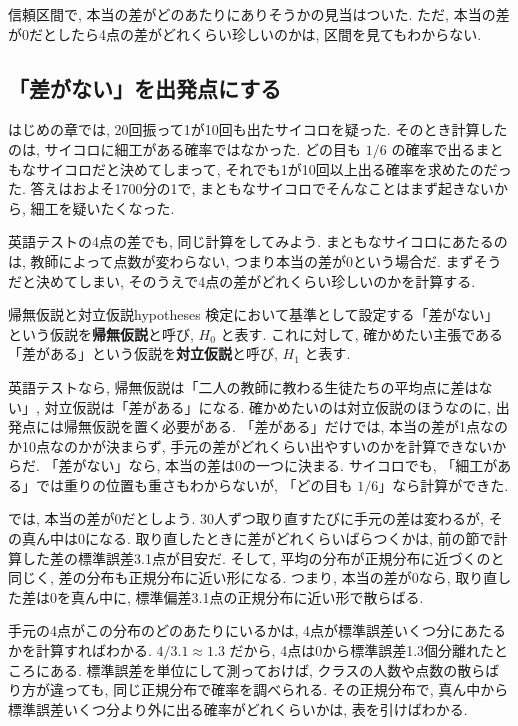     信頼区間で, 本当の差がどのあたりにありそうかの見当はついた.
    ただ, 本当の差が0だとしたら4点の差がどれくらい珍しいのかは, 区間を見てもわからない.

  \subsection{「差がない」を出発点にする}

    はじめの章では, 20回振って1が10回も出たサイコロを疑った.
    そのとき計算したのは, サイコロに細工がある確率ではなかった.
    どの目も $1/6$ の確率で出るまともなサイコロだと決めてしまって, それでも1が10回以上出る確率を求めたのだった.
    答えはおよそ1700分の1で, まともなサイコロでそんなことはまず起きないから, 細工を疑いたくなった.

    英語テストの4点の差でも, 同じ計算をしてみよう.
    まともなサイコロにあたるのは, 教師によって点数が変わらない, つまり本当の差が0という場合だ.
    まずそうだと決めてしまい, そのうえで4点の差がどれくらい珍しいのかを計算する.

    \begin{defi}{帰無仮説と対立仮説}{hypotheses}
      検定において基準として設定する「差がない」という仮説を\textbf{帰無仮説}と呼び, $H_0$ と表す.
      これに対して, 確かめたい主張である「差がある」という仮説を\textbf{対立仮説}と呼び, $H_1$ と表す.
    \end{defi}

    英語テストなら, 帰無仮説は「二人の教師に教わる生徒たちの平均点に差はない」, 対立仮説は「差がある」になる.
    確かめたいのは対立仮説のほうなのに, 出発点には帰無仮説を置く必要がある.
    「差がある」だけでは, 本当の差が1点なのか10点なのかが決まらず, 手元の差がどれくらい出やすいのかを計算できないからだ.
    「差がない」なら, 本当の差は0の一つに決まる.
    サイコロでも, 「細工がある」では重りの位置も重さもわからないが, 「どの目も $1/6$」なら計算ができた.

    では, 本当の差が0だとしよう.
    30人ずつ取り直すたびに手元の差は変わるが, その真ん中は0になる.
    取り直したときに差がどれくらいばらつくかは, 前の節で計算した差の標準誤差3.1点が目安だ.
    そして, 平均の分布が正規分布に近づくのと同じく, 差の分布も正規分布に近い形になる.
    つまり, 本当の差が0なら, 取り直した差は0を真ん中に, 標準偏差3.1点の正規分布に近い形で散らばる.

    手元の4点がこの分布のどのあたりにいるかは, 4点が標準誤差いくつ分にあたるかを計算すればわかる.
    $4 / 3.1 \approx 1.3$ だから, 4点は0から標準誤差1.3個分離れたところにある.
    標準誤差を単位にして測っておけば, クラスの人数や点数の散らばり方が違っても, 同じ正規分布で確率を調べられる.
    その正規分布で, 真ん中から標準誤差いくつ分より外に出る確率がどれくらいかは, 表を引けばわかる.

